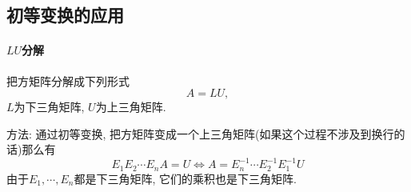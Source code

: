 \subsection{初等变换的应用}
\paragraph{$LU$分解}
把方矩阵分解成下列形式 
\begin{equation}
  A = LU,
\end{equation}
$L$为下三角矩阵, $U$为上三角矩阵.

方法: 通过初等变换, 把方矩阵变成一个上三角矩阵(如果这个过程不涉及到换行的话)那么有
\begin{equation}
  E_1 E_2 \cdots E_{n} A = U \iff A = E_n ^{-1} \cdots E_2^{-1} E_1^{-1} U
\end{equation}
由于$E_1 ,\cdots ,E_n$都是下三角矩阵, 它们的乘积也是下三角矩阵.

